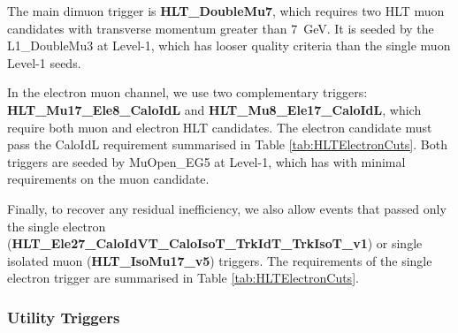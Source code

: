  
The main dimuon trigger is {\bf HLT\_DoubleMu7}, which
requires two HLT muon candidates with transverse momentum greater than $7$~GeV. 
It is seeded by the {L1\_DoubleMu3} at Level-1, 
which has looser quality criteria than the single muon Level-1 seeds.
 
In the electron muon channel, we use two complementary triggers: 
{\bf HLT\_Mu17\_Ele8\_CaloIdL} and {\bf HLT\_Mu8\_Ele17\_CaloIdL}, which require
both muon and electron HLT candidates.
The electron candidate must pass the CaloIdL requirement
summarised in Table \ref{tab:HLTElectronCuts}.
Both triggers are seeded by {MuOpen\_EG5} at Level-1, which has 
with minimal requirements on the muon candidate.

Finally, to recover any residual inefficiency, 
we also allow events that passed only the single electron 
({\bf HLT\_Ele27\_CaloIdVT\_CaloIsoT\_TrkIdT\_TrkIsoT\_v1}) or single 
isolated muon ({\bf HLT\_IsoMu17\_v5}) triggers. 
The requirements of the single electron trigger are summarised in Table \ref{tab:HLTElectronCuts}. 

%

\subsubsection{Utility Triggers}
\label{sec:utilityTriggers}

